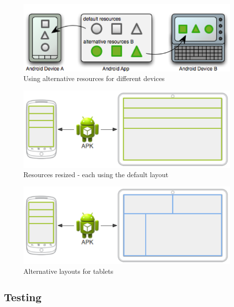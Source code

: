 \begin{figure}[H]%
\centering
\includegraphics[width=\textwidth]{images/res_separate}
\caption{Using alternative resources for different devices}
\label{fig:res_separate}
\end{figure}


\begin{figure}[H]%
\centering
\includegraphics[width=\textwidth]{images/res-layout-default}
\caption{Resources resized - each using the default layout}
\label{fig:res-layout-defaultt}
\end{figure}

\begin{figure}[H]%
\centering
\includegraphics[width=\textwidth]{images/res-layout-alt}
\caption{Alternative layouts for tablets}
\label{fig:res-layout-alt}
\end{figure}

\subsection{Testing}

